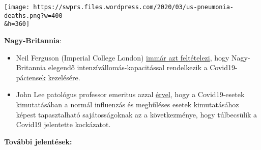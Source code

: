 \texttt{[image: https://swprs.files.wordpress.com/2020/03/us-pneumonia-deaths.png?w=400\\\&h=360]}

\textbf{Nagy-Britannia}:

\begin{itemize}
\tightlist
\item
  Neil Ferguson (Imperial College London)
  \href{https://www.newscientist.com/article/2238578-uk-has-enough-intensive-care-units-for-coronavirus-expert-predicts/}{immár
  azt feltételezi}, hogy Nagy-Britannia elegendő
  intenzívállomás-kapacitással rendelkezik a Covid19-páciensek
  kezelésére.
\item
  John Lee patológus professor emeritus azzal
  \href{https://www.spectator.co.uk/article/The-evidence-on-Covid-19-is-not-as-clear-as-we-think}{érvel},
  hogy a Covid19-esetek kimutatásában a normál influenzás és meghűléses
  esetek kimutatásához képest tapasztalható sajátosságoknak az a
  következménye, hogy túlbecsülik a Covid19 jelentette kockázatot.
\end{itemize}

\textbf{További jelentések:}

